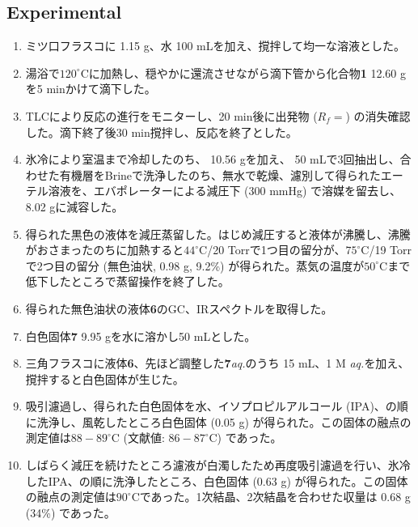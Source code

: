 \documentclass{ltjsarticle}
\theoremstyle{definition}
\numberwithin{equation}{section}
\newcommand{\D}{^\circ\text{C}}
\begin{document}
\subsection{Experimental}
\begin{enumerate}
\item ミツ口フラスコに 1.15 g、水 100 mLを加え、撹拌して均一な溶液とした。
\item 湯浴で$120\D$に加熱し、穏やかに還流させながら滴下管から化合物\textbf{1} 12.60 gを5 minかけて滴下した。 
\item TLCにより反応の進行をモニターし、20 min後に出発物 ($R_f = %
$) の消失確認した。滴下終了後30 min撹拌し、反応を終了とした。
\item 氷冷により室温まで冷却したのち、 10.56 gを加え、 50 mLで3回抽出し、合わせた有機層をBrineで洗浄したのち、無水で乾燥、濾別して得られたエーテル溶液を、エバポレーターによる減圧下 (300 mmHg) で溶媒を留去し、8.02 gに減容した。
\item 得られた黒色の液体を減圧蒸留した。はじめ減圧すると液体が沸騰し、沸騰がおさまったのちに加熱すると$44\D$/20 Torrで1つ目の留分が、$75\D$/19 Torrで2つ目の留分 (無色油状, 0.98 g, 9.2\%) が得られた。蒸気の温度が$50\D$まで低下したところで蒸留操作を終了した。
\item 得られた無色油状の液体\textbf{6}のGC、IRスペクトルを取得した。
\item 白色固体\textbf{7} 9.95 gを水に溶かし50 mLとした。
\item 三角フラスコに液体\textbf{6}、先ほど調整した\textbf{7}\textit{aq.}のうち 15 mL、1 M \textit{aq.}を加え、撹拌すると白色固体が生じた。
\item 吸引濾過し、得られた白色固体を水、イソプロピルアルコール (IPA)、の順に洗浄し、風乾したところ白色固体 (0.05 g) が得られた。この固体の融点の測定値は$88-89\D$ (文献値: $86-87\D$) であった。
\item しばらく減圧を続けたところ濾液が白濁したため再度吸引濾過を行い、氷冷したIPA、の順に洗浄したところ、白色固体 (0.63 g) が得られた。この固体の融点の測定値は$90\D$であった。1次結晶、2次結晶を合わせた収量は 0.68 g (34\%) であった。
\end{enumerate}
\end{document}
